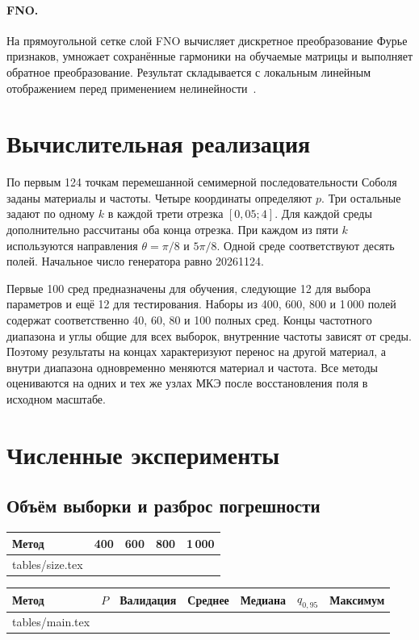 \documentclass[11pt,a4paper]{article}
\makeatletter
\newenvironment{localtable}{\par\medskip\begingroup\centering\small\renewcommand{\arraystretch}{1.18}}{\par\endgroup\medskip}
\newcommand{\tabinput}[1]{\@@input #1.tex }
\makeatother
\begin{document}
\paragraph{FNO.}
На прямоугольной сетке слой FNO вычисляет дискретное преобразование Фурье признаков, умножает сохранённые гармоники на обучаемые матрицы и выполняет обратное преобразование. Результат складывается с локальным линейным отображением перед применением нелинейности~\cite{li}. 

\section{Вычислительная реализация}
По первым 124 точкам перемешанной семимерной последовательности Соболя заданы материалы и частоты. Четыре координаты определяют $p$. Три остальные задают по одному $k$ в каждой трети отрезка $[0{,}05;4]$. Для каждой среды дополнительно рассчитаны оба конца отрезка. При каждом из пяти $k$ используются направления $\theta=\pi/8$ и $5\pi/8$. Одной среде соответствуют десять полей. Начальное число генератора равно 20261124.

Первые 100 сред предназначены для обучения, следующие 12 для выбора параметров и ещё 12 для тестирования. Наборы из 400, 600, 800 и 1\,000 полей содержат соответственно 40, 60, 80 и 100 полных сред. Концы частотного диапазона и углы общие для всех выборок, внутренние частоты зависят от среды. Поэтому результаты на концах характеризуют перенос на другой материал, а внутри диапазона одновременно меняются материал и частота. Все методы оцениваются на одних и тех же узлах МКЭ после восстановления поля в исходном масштабе. 

\clearpage
\section{Численные эксперименты}
\subsection*{Объём выборки и разброс погрешности}
\begin{localtable}
\begin{tabular}{lrrrr}\toprule Метод & 400 & 600 & 800 & 1\,000 \\\midrule
\tabinput{tables/size}\bottomrule\end{tabular}
\end{localtable}
\begin{localtable}
\begin{tabular}{lrrrrrr}\toprule Метод & $P$ & Валидация & Среднее & Медиана & $q_{0{,}95}$ & Максимум\\\midrule
\tabinput{tables/main}\bottomrule\end{tabular}
\end{localtable}
\end{document}
